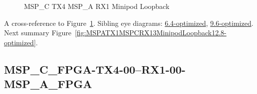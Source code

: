 \begin{figure}[h]
\begin{subfigure}{0.33\textwidth}
\hyperref[sec:MSPCFPGATX406RX106MSPAFPGA12.8-optimized]{}
\end{subfigure}\hspace*{\fill}
\begin{subfigure}{0.33\textwidth}
\hyperref[sec:MSPCFPGATX407RX107MSPAFPGA12.8-optimized]{}
\end{subfigure}\hspace*{\fill}
\begin{subfigure}{0.33\textwidth}
\hyperref[sec:MSPCFPGATX408RX108MSPAFPGA12.8-optimized]{}
\end{subfigure}

\begin{subfigure}{0.33\textwidth}
\hyperref[sec:MSPCFPGATX409RX109MSPAFPGA12.8-optimized]{}
\end{subfigure}\hspace*{\fill}
\begin{subfigure}{0.33\textwidth}
\hyperref[sec:MSPCFPGATX410RX110MSPAFPGA12.8-optimized]{}
\end{subfigure}\hspace*{\fill}
\begin{subfigure}{0.33\textwidth}
\hyperref[sec:MSPCFPGATX411RX111MSPAFPGA12.8-optimized]{}
\end{subfigure}

\caption{MSP\_C TX4 MSP\_A RX1 Minipod Loopback} \label{fig:MSPCTX4MSPARX1MinipodLoopback12.8-optimized}
\end{figure}

A cross-reference to Figure~\ref{fig:MSPCTX4MSPARX1MinipodLoopback12.8-optimized}.
Sibling eye diagrams: \hyperref[sec:MSPCTX4MSPARX1MinipodLoopback6.4-optimized]{6.4-optimized}, \hyperref[sec:MSPCTX4MSPARX1MinipodLoopback9.6-optimized]{9.6-optimized}. \\
Next summary Figure~\ref{fig:MSPATX1MSPCRX13MinipodLoopback12.8-optimized}.
\clearpage
% 
\subsection{MSP\_C\_FPGA-TX4-00--RX1-00-MSP\_A\_FPGA}\label{sec:MSPCFPGATX400RX100MSPAFPGA12.8-optimized}


